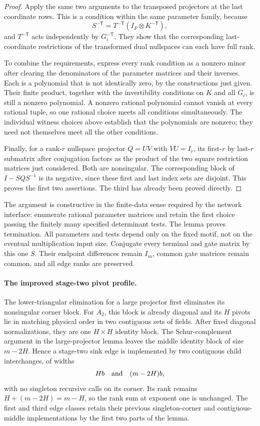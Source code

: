 \begin{proof}
Apply the same two arguments to the transposed projectors at the last
coordinate rows. This is a condition within the same parameter family,
because
\[
 S^{-\mathsf T}=T^{-\mathsf T}(I_F\otimes K^{-\mathsf T}),
\]
and $T^{-\mathsf T}$ acts independently by $G_i^{-\mathsf T}$.
They show that the corresponding last-coordinate restrictions of the
transformed dual nullspaces can each have full rank.

To combine the requirements, express every rank condition as a nonzero
minor after clearing the denominators of the parameter matrices and their
inverses. Each is a polynomial that is not identically zero, by the
constructions just given. Their finite product, together with the
invertibility conditions on $K$ and all $G_i$, is still a nonzero polynomial.
A nonzero rational polynomial cannot vanish at every rational tuple, so
one rational choice meets all conditions simultaneously. The individual
witness choices above establish that the polynomials are nonzero; they
need not themselves meet all the other conditions.

Finally, for a rank-$r$ nullspace projector $Q=UV$ with $VU=I_r$, its
first-$r$ by last-$r$ submatrix after conjugation factors as the product
of the two square restriction matrices just considered. Both are
nonsingular. The corresponding block of $I-SQS^{-1}$ is its negative,
since these first and last index sets are disjoint. This proves the first
two assertions. The third has already been proved directly.
\end{proof}

The argument is constructive in the finite-data sense required by the
network interface: enumerate rational parameter matrices and retain the
first choice passing the finitely many specified determinant tests. The
lemma proves termination. All parameters and tests depend only on the fixed
motif, not on the eventual multiplication input size. Conjugate every
terminal and gate matrix by this one $S$. Their endpoint differences remain
$I_m$, common gate matrices remain common, and all edge ranks are preserved.

\paragraph{The improved stage-two pivot profile.}
The lower-triangular elimination for a large projector first eliminates its
nonsingular corner block. For $A_2$, this block is already diagonal and its
$H$ pivots lie in matching physical order in two contiguous sets of fields.
After fixed diagonal normalizations, they are one $H\times H$ identity
block. The Schur-complement argument in the large-projector lemma leaves
the middle identity block of size $m-2H$. Hence a stage-two sink edge is
implemented by two contiguous child interchanges, of widths
\[
 Hb\quad\hbox{and}\quad(m-2H)b,
\]
with no singleton recursive calls on its corner. Its rank remains
$H+(m-2H)=m-H$, so the rank sum at exponent one is unchanged.
The first and third edge classes retain their previous singleton-corner
and contiguous-middle implementations by the first two parts of the lemma.

